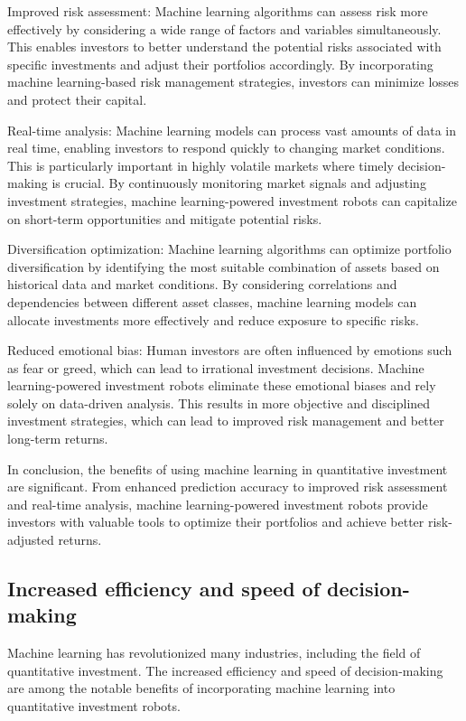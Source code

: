 \documentclass[UTF8]{ctexart}
\begin{document}
Improved risk assessment: Machine learning algorithms can assess risk more effectively by considering a wide range of factors and variables simultaneously. This enables investors to better understand the potential risks associated with specific investments and adjust their portfolios accordingly. By incorporating machine learning-based risk management strategies, investors can minimize losses and protect their capital.

Real-time analysis: Machine learning models can process vast amounts of data in real time, enabling investors to respond quickly to changing market conditions. This is particularly important in highly volatile markets where timely decision-making is crucial. By continuously monitoring market signals and adjusting investment strategies, machine learning-powered investment robots can capitalize on short-term opportunities and mitigate potential risks.

Diversification optimization: Machine learning algorithms can optimize portfolio diversification by identifying the most suitable combination of assets based on historical data and market conditions. By considering correlations and dependencies between different asset classes, machine learning models can allocate investments more effectively and reduce exposure to specific risks.

Reduced emotional bias: Human investors are often influenced by emotions such as fear or greed, which can lead to irrational investment decisions. Machine learning-powered investment robots eliminate these emotional biases and rely solely on data-driven analysis. This results in more objective and disciplined investment strategies, which can lead to improved risk management and better long-term returns.

In conclusion, the benefits of using machine learning in quantitative investment are significant. From enhanced prediction accuracy to improved risk assessment and real-time analysis, machine learning-powered investment robots provide investors with valuable tools to optimize their portfolios and achieve better risk-adjusted returns.
\subsection{Increased efficiency and speed of decision-making}
Machine learning has revolutionized many industries, including the field of quantitative investment. The increased efficiency and speed of decision-making are among the notable benefits of incorporating machine learning into quantitative investment robots.
\end{document}
